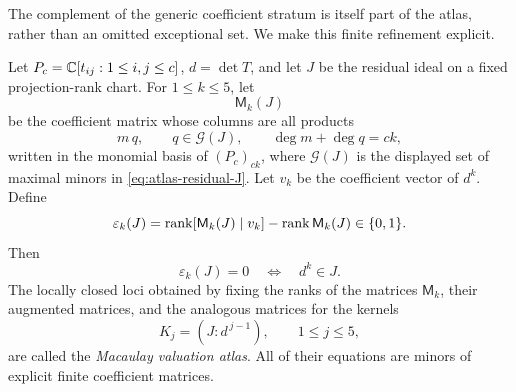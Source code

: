 The complement of the generic coefficient stratum is itself part of
the atlas, rather than an omitted exceptional set.  We make this
finite refinement explicit.

\begin{definition}
\label{def:macaulay-atlas}
Let \(P_c=\mathbb C[t_{ij}:1\le i,j\le c]\), \(d=\det T\), and let \(J\)
be the residual ideal on a fixed projection-rank chart.  For
\(1\le k\le5\), let
\[
 \mathsf M_k(J)
\]
be the coefficient matrix whose columns are all products
\[
 m\,q,\qquad
 q\in\mathcal G(J),\qquad
 \deg m+\deg q=ck,
\]
written in the monomial basis of \((P_c)_{ck}\), where
\(\mathcal G(J)\) is the displayed set of maximal minors in
\eqref{eq:atlas-residual-J}.  Let \(v_k\) be the coefficient vector
of \(d^k\).  Define
\[
 \varepsilon_k(J)=
 \operatorname{rank}[\mathsf M_k(J)\mid v_k]-\operatorname{rank}\mathsf M_k(J)\in\{0,1\}.
\]
Then
\[
 \varepsilon_k(J)=0\quad\Longleftrightarrow\quad d^k\in J.
\]
The locally closed loci obtained by fixing the ranks of the matrices
\(\mathsf M_k\), their augmented matrices, and the analogous matrices
for the kernels
\[
 K_j=(J:d^{\,j-1}),\qquad1\le j\le5,
\]
are called the \emph{Macaulay valuation atlas}.  All of their
equations are minors of explicit finite coefficient matrices.
\end{definition}

